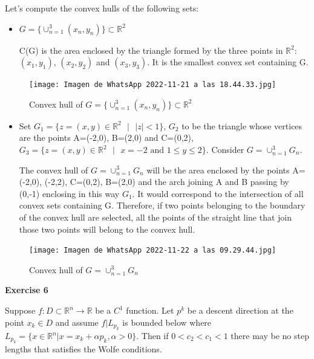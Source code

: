 \documentclass[12pt,letterpaper]{article}
\theoremstyle{definition}
\begin{document}
    Let's compute the convex hulls of the following sets:
\begin{itemize}
    \item $G= \{\cup_{n=1}^{3}(x_{n},y_n)\}\subset \mathbb{R}^2$
    
    C(G) is the area enclosed by the triangle formed by the three points in $\mathbb{R}^2$: $(x_1,y_1)$, $(x_2,y_2)$ and $(x_3,y_3)$. It is the smallest convex set containing G.
     \end{itemize}
    \begin{figure}[H]
        \centering
        \texttt{[image: Imagen de WhatsApp 2022-11-21 a las 18.44.33.jpg]}
        \caption{Convex hull of $G= \{\cup_{n=1}^{3}(x_{n},y_n)\}\subset \mathbb{R}^2$}
    \end{figure}
    
    \begin{itemize}
    
    \item Set $G_1=\{z=(x,y)\in \mathbb{R}^2\text{ }|\text{ }|z|<1\}$, $G_2$ to be the triangle whose vertices are the points A=(-2,0), B=(2,0) and C=(0,2), $G_3=\{z=(x,y)\in \mathbb{R}^2\text{ }|\text{ }x=-2 \text{ and }1\leq y \leq 2\}$. Consider $G=\cup_{n=1}^{3}G_n$.
    
    The convex hull of $G=\cup_{n=1}^{3}G_n$ will be the area enclosed by the points A=(-2,0), (-2,2), C=(0,2), B=(2,0) and the arch joining A and B passing by (0,-1) enclosing in this way $G_1$. It would correspond to the intersection of all convex sets containing G. Therefore, if two points belonging to the boundary of the convex hull are selected, all the points of the straight line that join those two points will belong to the convex hull.
        
    \end{itemize}
    \begin{figure}[H]
        \centering
        \texttt{[image: Imagen de WhatsApp 2022-11-22 a las 09.29.44.jpg]}
        \caption{Convex hull of $G=\cup_{n=1}^{3}G_n$}
    \end{figure}
      
\hfill\break

\textbf{Exercise 6} 

Suppose $f : D \subset \mathbb{R}^n \to \mathbb{R}$ be a $C^1$ function. Let $p^k$ be a
descent direction at the point $x_k \in D$ and assume $f |L_{p_k}$ is bounded
below where $L_{p_k} = \{x \in \mathbb{R}^n | x = x_k + \alpha p_k , \alpha > 0\}$. Then if
$0 < c_2 < c_1 < 1$ there may be no step
lengths that satisfies the Wolfe conditions.
\end{document}
